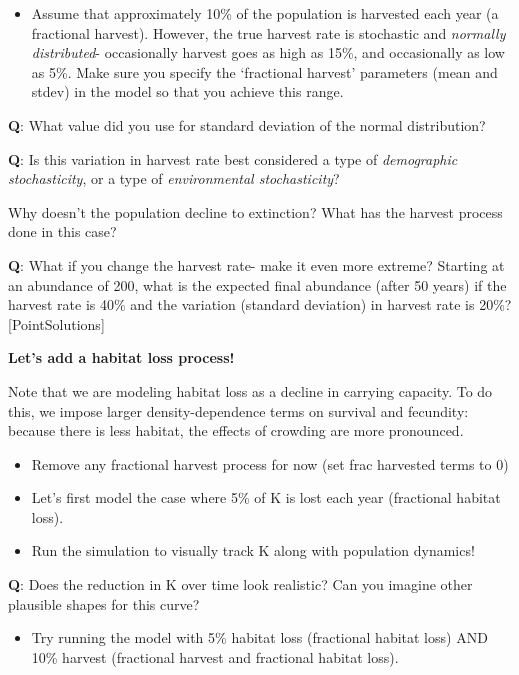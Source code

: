 \documentclass[
]{article}
\providecommand{\tightlist}{%
  \setlength{\itemsep}{0pt}\setlength{\parskip}{0pt}}
\begin{document}
\begin{itemize}
\tightlist
\item
  Assume that approximately 10\% of the population is harvested each
  year (a fractional harvest). However, the true harvest rate is
  stochastic and \emph{normally distributed}- occasionally harvest goes
  as high as 15\%, and occasionally as low as 5\%. Make sure you specify
  the `fractional harvest' parameters (mean and stdev) in the model so
  that you achieve this range.
\end{itemize}

\textbf{Q}: What value did you use for standard deviation of the normal
distribution?

\textbf{Q}: Is this variation in harvest rate best considered a type of
\emph{demographic stochasticity}, or a type of \emph{environmental
stochasticity}?

Why doesn't the population decline to extinction? What has the harvest
process done in this case?

\textbf{Q}: What if you change the harvest rate- make it even more
extreme? Starting at an abundance of 200, what is the expected final
abundance (after 50 years) if the harvest rate is 40\% and the variation
(standard deviation) in harvest rate is 20\%? {[}PointSolutions{]}

\textbf{Let's add a habitat loss process!}

Note that we are modeling habitat loss as a decline in carrying
capacity. To do this, we impose larger density-dependence terms on
survival and fecundity: because there is less habitat, the effects of
crowding are more pronounced.

\begin{itemize}
\item
  Remove any fractional harvest process for now (set frac harvested
  terms to 0)
\item
  Let's first model the case where 5\% of K is lost each year
  (fractional habitat loss).
\item
  Run the simulation to visually track K along with population dynamics!
\end{itemize}

\textbf{Q}: Does the reduction in K over time look realistic? Can you
imagine other plausible shapes for this curve?

\begin{itemize}
\tightlist
\item
  Try running the model with 5\% habitat loss (fractional habitat loss)
  AND 10\% harvest (fractional harvest and fractional habitat loss).
\end{itemize}
\end{document}
